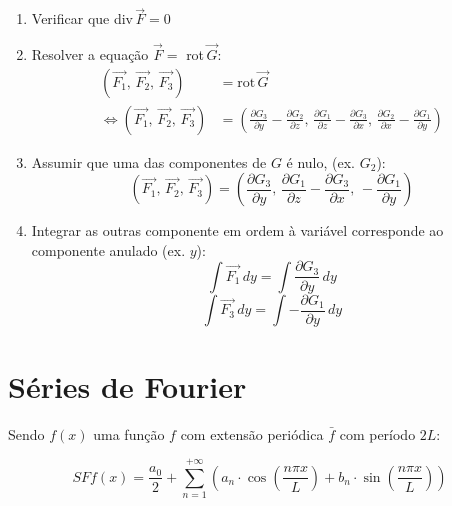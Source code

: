 \documentclass[11pt, a4paper]{article}
\begin{document}
\begin{enumerate}
    \item Verificar que div\,$\vec{F} = 0$
    \item Resolver a equação $\vec{F} =$ rot\,$\vec{G}$:
          \begin{align*}
              \left(\vec{F_1},\,\vec{F_2},\,\vec{F_3}\right) & = \text{rot}\,\vec{G}
              \\ \Leftrightarrow
              \left(\vec{F_1},\,\vec{F_2},\,\vec{F_3}\right) & =
              \left(\frac{\partial G_3}{\partial y} - \frac{\partial G_2}{\partial z}
              ,\,\frac{\partial G_1}{\partial z} - \frac{\partial G_3}{\partial x}
              ,\,\frac{\partial G_2}{\partial x} - \frac{\partial G_1}{\partial y}
              \right)
          \end{align*}
    \item Assumir que uma das componentes de $G$ é nulo, (ex. $G_2$):
          \begin{equation*}
              \left(\vec{F_1},\,\vec{F_2},\,\vec{F_3}\right) =
              \left(\frac{\partial G_3}{\partial y}
              ,\,\frac{\partial G_1}{\partial z} - \frac{\partial G_3}{\partial x}
              ,\, - \frac{\partial G_1}{\partial y}
              \right)
          \end{equation*}
    \item Integrar as outras componente em ordem à variável corresponde ao
          componente anulado (ex. $y$):
          \begin{equation*}
              \int \vec{F_1} \,dy = \int \frac{\partial G_3}{\partial y} \,dy
          \end{equation*}
          \begin{equation*}
              \int \vec{F_3} \,dy = \int -\frac{\partial G_1}{\partial y} \,dy
          \end{equation*}
\end{enumerate}

\newpage

\section{Séries de Fourier}

Sendo $f(x)$ uma função $f$ com extensão periódica $\bar{f}$ com período $2L$:

\begin{equation*}
    SFf(x) = \frac{a_0}{2} + \sum_{n=1}^{+\infty}
    \left(
    a_n \cdot \cos\left(\frac{n\pi x}{L}\right) +
    b_n \cdot \sin\left(\frac{n\pi x}{L}\right)
    \right)
\end{equation*}
\end{document}
